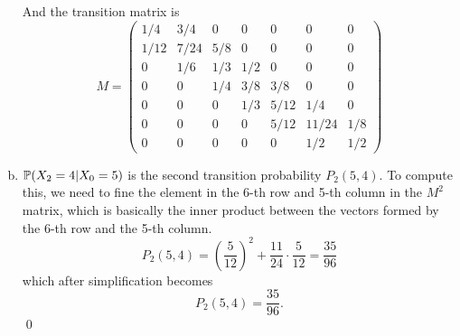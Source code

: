 \begin{solution}
\begin{enumerate}[(a)]
\begin{center}
		\end{center}
		And the transition matrix is
		\[  M =
		\begin{pmatrix}
			1/4 & 3/4 & 0 & 0 & 0 & 0 & 0 \\
			1/12 & 7/24 & 5/8 & 0 & 0 & 0 & 0 \\
			0 & 1/6 & 1/3 & 1/2 & 0 & 0 & 0 \\
			0 & 0 & 1/4 & 3/8 & 3/8 & 0 & 0 \\
			0 & 0 & 0 & 1/3 & 5/12 & 1/4 & 0 \\
			0 & 0 & 0 & 0 & 5/12 & 11/24 & 1/8 \\
			0 & 0 & 0 & 0 & 0 & 1/2 & 1/2
		\end{pmatrix}
		\]
		
		\item $\mathbb{P}(X_2 = 4|X_0=5)$ is the second transition probability $P_2(5,4)$. To compute this, we need to fine the element in the 6-th row and 5-th column in the $M^2$ matrix, which is basically the inner product between the vectors formed by the 6-th row and the 5-th column.
		\[ P_2(5,4) = (\frac{5}{12})^2 + \frac{11}{24}\cdot\frac{5}{12} = \frac{35}{96} \]
		which after simplification becomes
		\[ \boxed{P_2(5,4) = \frac{35}{96}}. \]
		\qed
		
	\end{enumerate}
\end{solution}



